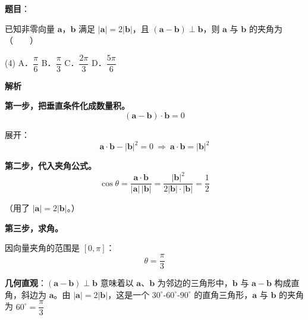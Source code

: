\begin{answer}

\textbf{题目}：

已知非零向量 $\boldsymbol a$，$\boldsymbol b$ 满足 $|\boldsymbol a|=2|\boldsymbol b|$，且 $(\boldsymbol a-\boldsymbol b)\perp\boldsymbol b$，则 $\boldsymbol a$ 与 $\boldsymbol b$ 的夹角为\mbox{（　　）}

\begin{gkopts}(4)
\task A．$\dfrac\pi6$
\task B．$\dfrac\pi3$
\task C．$\dfrac{2\pi}3$
\task D．$\dfrac{5\pi}6$
\end{gkopts}

\textbf{解析}

\textbf{第一步，把垂直条件化成数量积。}
\nopagebreak[4]
\[(\boldsymbol a-\boldsymbol b)\cdot\boldsymbol b=0\]

展开：
\nopagebreak[4]
\[\boldsymbol a\cdot\boldsymbol b-|\boldsymbol b|^{2}=0\ \Longrightarrow\ \boldsymbol a\cdot\boldsymbol b=|\boldsymbol b|^{2}\]

\textbf{第二步，代入夹角公式。}
\nopagebreak[4]
\[\cos\theta=\frac{\boldsymbol a\cdot\boldsymbol b}{|\boldsymbol a|\,|\boldsymbol b|}=\frac{|\boldsymbol b|^{2}}{2|\boldsymbol b|\cdot|\boldsymbol b|}=\frac12\]

（用了 $|\boldsymbol a|=2|\boldsymbol b|$。）

\textbf{第三步，求角。}

因向量夹角的范围是 $[0,\pi]$：
\nopagebreak[4]
\[\theta=\frac\pi3\]

\begin{gktip}
\textbf{几何直观}：$(\boldsymbol a-\boldsymbol b)\perp\boldsymbol b$ 意味着以 $\boldsymbol a$、$\boldsymbol b$ 为邻边的三角形中，$\boldsymbol b$ 与 $\boldsymbol a-\boldsymbol b$ 构成直角，斜边为 $\boldsymbol a$。由 $|\boldsymbol a|=2|\boldsymbol b|$，这是一个 $30^\circ$-$60^\circ$-$90^\circ$ 的直角三角形，$\boldsymbol a$ 与 $\boldsymbol b$ 的夹角为 $60^\circ=\dfrac\pi3$ 
\end{gktip}


\par\medskip

\end{answer}
